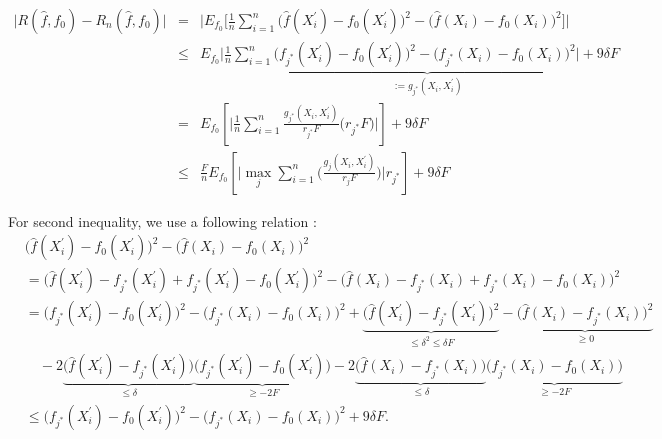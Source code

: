 \documentclass{article}
\theoremstyle{definition}
\begin{document}
\begin{eqnarray*}
    \bigg| R(\widehat{f},f_{0})-R_n(\widehat{f},f_{0}) \bigg| 
    &=& \Bigg| E_{f_0} \bigg[\frac{1}{n}\sum_{i=1}^{n}\big( \widehat{f}(X_{i}^{'})-f_{0}(X_{i}^{'}) \big)^{2} - \big( \widehat{f}(X_{i})-f_{0}(X_{i}) \big)^{2} \bigg]\Bigg| \\
    &\leq& E_{f_0} \bigg| \frac{1}{n}\sum_{i=1}^{n}\big( 
    \underbrace{f_{j^*}(X_{i}^{'})-f_{0}(X_{i}^{'}) \big)^{2} - \big( f_{j^*}(X_{i})-f_{0}(X_{i}) \big)^{2}}_{:=g_{j^*}(X_i,X_i^{'})} \bigg| + 9\delta F \\
    &=& E_{f_0} \left[ \bigg| \frac{1}{n}\sum_{i=1}^{n} \frac{g_{j^*}(X_i,X_i^{'})}{r_{j^*}F} \big( r_{j^*}F \big) \bigg| \right] + 9\delta F \\
    &\leq& \frac{F}{n} E_{f_0} \left[\bigg| \max_{j} \sum_{i=1}^{n} \bigg( \frac{g_{j}(X_i,X_i^{'})}{r_{j}F} \bigg) \bigg| r_{j^*} \right]  + 9\delta F
\end{eqnarray*}

For second inequality, we use a following relation : 
\begin{align*}
    &\big(\widehat{f}(X_{i}^{'})-f_{0}(X_{i}^{'}) \big)^{2} - \big( \widehat{f}(X_{i})-f_{0}(X_{i}) \big)^{2} \\
    &= \big(\widehat{f}(X_{i}^{'})-f_{j^*}(X_{i}^{'}) +f_{j^*}(X_{i}^{'}) - f_{0}(X_{i}^{'}) \big)^{2} - \big( \widehat{f}(X_{i})-f_{j^*}(X_{i}) +f_{j^*}(X_{i})-f_{0}(X_{i}) \big)^{2} \\
    &= \big(f_{j^*}(X_{i}^{'}) - f_{0}(X_{i}^{'})\big)^{2} - \big(f_{j^*}(X_{i}) - f_{0}(X_{i})\big)^{2} + \underbrace{\big(\widehat{f}(X_{i}^{'})-f_{j^*}(X_{i}^{'})\big)^{2}}_{\leq \delta^{2} \leq \delta F}
    -\underbrace{\big(\widehat{f}(X_{i})-f_{j^*}(X_{i})\big)^{2}}_{\geq 0} \\
    & \quad -2\underbrace{\big(\widehat{f}(X_{i}^{'})-f_{j^*}(X_{i}^{'})\big)}_{\leq \delta}\underbrace{\big(f_{j^*}(X_{i}^{'}) - f_{0}(X_{i}^{'})\big)}_{\geq -2F} -2\underbrace{\big(\widehat{f}(X_{i})-f_{j^*}(X_{i})\big)}_{\leq\delta}\underbrace{\big(f_{j^*}(X_{i}) - f_{0}(X_{i})\big)}_{\geq -2F}\\
    &\leq \big(f_{j^*}(X_{i}^{'}) - f_{0}(X_{i}^{'})\big)^{2} - \big(f_{j^*}(X_{i}) - f_{0}(X_{i})\big)^{2} + 9\delta F.
\end{align*}
\end{document}
